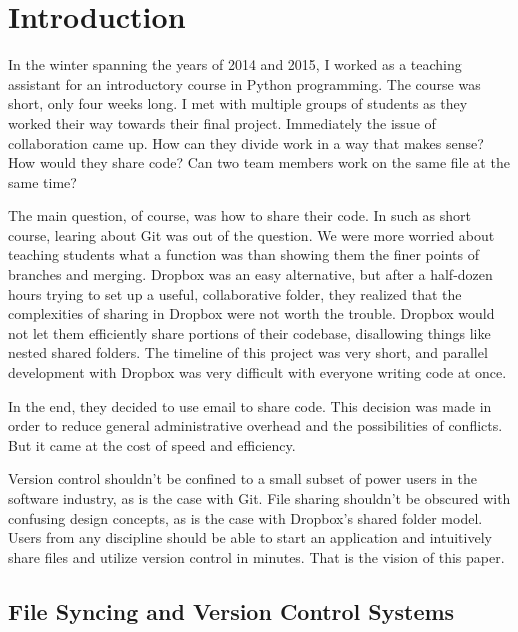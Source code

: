 \chapter{Introduction}

In the winter spanning the years of 2014 and 2015, I worked as a teaching assistant for an introductory course in Python programming. The course was short, only four weeks long. I met with multiple groups of students as they worked their way towards their final project. Immediately the issue of collaboration came up. How can they divide work in a way that makes sense? How would they share code? Can two team members work on the same file at the same time?

The main question, of course, was how to share their code. In such as short course, learing about Git was out of the question. We were more worried about teaching students what a function was than showing them the finer points of branches and merging. Dropbox was an easy alternative, but after a half-dozen hours trying to set up a useful, collaborative folder, they realized that the complexities of sharing in Dropbox were not worth the trouble. Dropbox would not let them efficiently share portions of their codebase, disallowing things like nested shared folders. The timeline of this project was very short, and parallel development with Dropbox was very difficult with everyone writing code at once. 

In the end, they decided to use email to share code. This decision was made in order to reduce general administrative overhead and the possibilities of conflicts. But it came at the cost of speed and efficiency.

Version control shouldn't be confined to a small subset of power users in the software industry, as is the case with Git. File sharing shouldn't be obscured with confusing design concepts, as is the case with Dropbox's shared folder model. Users from any discipline should be able to start an application and intuitively share files and utilize version control in minutes. That is the vision of this paper.

\section{File Syncing and Version Control Systems}

